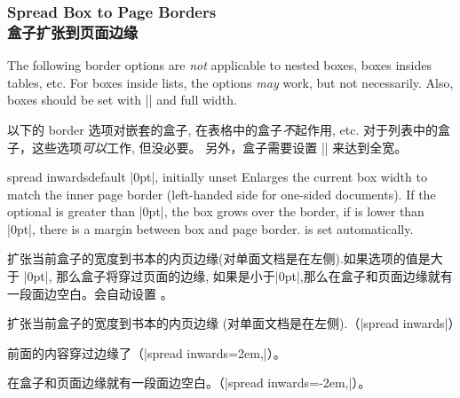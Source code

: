 





\subsubsection{Spread Box to Page Borders\\盒子扩张到页面边缘}

\begin{marker} 
The following border options are \emph{not} applicable to nested boxes, boxes insides tables, etc.
For boxes inside lists, the options \emph{may} work, but not necessarily.
Also, boxes should be set with |\noindent| and full width.

以下的 border 选项对嵌套的盒子, 在表格中的盒子\emph{不}起作用, etc.
对于列表中的盒子，这些选项\emph{可以}工作, 但没必要。
另外，盒子需要设置 |\noindent| 来达到全宽。
\end{marker}

\begin{docTcbKey}[][doc new=2017-02-13]{spread inwards}{}{default |0pt|, initially unset}
Enlarges the current box width to match the inner page border (left-handed side for one-sided
documents). If the optional  is greater than |0pt|, the box
grows over the border, if  is lower than |0pt|, there is a
margin between box and page border.
 is set automatically.

扩张当前盒子的宽度到书本的内页边缘(对单面文档是在左侧).如果选项的值是大于 |0pt|, 那么盒子将穿过页面的边缘, 如果是小于|0pt|,那么在盒子和页面边缘就有一段面边空白。会自动设置  。
\begin{dispListing}
\begin{tcolorbox}[enhanced,spread inwards,
colframe=blue!75!black,colback=white,show bounding box]
扩张当前盒子的宽度到书本的内页边缘 (对单面文档是在左侧).（|spread inwards|）
\end{tcolorbox}

\begin{tcolorbox}[enhanced,spread inwards=2em,
colframe=blue!75!black,colback=white,show bounding box]
前面的内容穿过边缘了（|spread inwards=2em,|）。
\end{tcolorbox}

\begin{tcolorbox}[enhanced,spread inwards=-2em,
colframe=blue!75!black,colback=white,show bounding box]
在盒子和页面边缘就有一段面边空白。（|spread inwards=-2em,|）。
\end{tcolorbox}
\end{dispListing}
{\tcbusetemp}
\end{docTcbKey}




